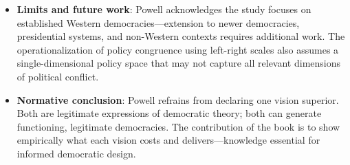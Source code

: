 \documentclass[12pt]{article}
\begin{document}
\begin{itemize}[leftmargin=*, itemsep=4pt]
    \item \textbf{Limits and future work}: Powell acknowledges the study focuses on established Western democracies---extension to newer democracies, presidential systems, and non-Western contexts requires additional work. The operationalization of policy congruence using left-right scales also assumes a single-dimensional policy space that may not capture all relevant dimensions of political conflict.
    \item \textbf{Normative conclusion}: Powell refrains from declaring one vision superior. Both are legitimate expressions of democratic theory; both can generate functioning, legitimate democracies. The contribution of the book is to show empirically what each vision costs and delivers---knowledge essential for informed democratic design.
\end{itemize}
\end{document}
